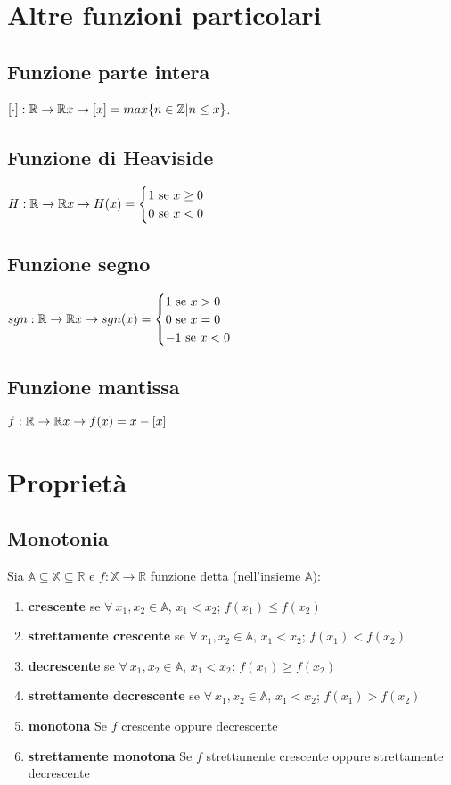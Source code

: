 \section{Altre funzioni particolari}
\subsection{Funzione parte intera}
$[\cdot]: \mathbb{R} \rightarrow \mathbb{R}\\
x \rightarrow [x] = max\{n \in \mathbb{Z} | n\leq x\}$.
\subsection{Funzione di Heaviside}
$H: \mathbb{R} \rightarrow \mathbb{R}\\
x \rightarrow H(x) =
\begin{cases}
1 \text{  se } x \geq 0\\
0 \text{  se } x < 0
\end{cases}$
\subsection{Funzione segno}
$sgn: \mathbb{R} \rightarrow \mathbb{R}\\
x \rightarrow sgn(x) =
\begin{cases}
1 \text{  se } x > 0\\
0 \text{  se } x = 0\\
-1 \text{  se } x < 0
\end{cases}$
\subsection{Funzione mantissa}
$f: \mathbb{R} \rightarrow \mathbb{R}\\
x \rightarrow f(x) = x - [x]$

\section{Proprietà}
\subsection{Monotonia}
Sia $\mathbb{A} \subseteq \mathbb{X} \subseteq \mathbb{R}$ e $f: \mathbb{X} \rightarrow \mathbb{R}$ funzione detta (nell'insieme $\mathbb{A}$):
\begin{enumerate}
\item \textbf{crescente} se $\forall\ x_1,x_2 \in \mathbb{A}$, $x_1<x_2$; $f(x_1) \leq f(x_2)$
\item \textbf{strettamente crescente} se $\forall\ x_1,x_2 \in \mathbb{A}$, $x_1<x_2$; $f(x_1) < f(x_2)$
\item \textbf{decrescente} se $\forall\ x_1,x_2 \in \mathbb{A}$, $x_1<x_2$; $f(x_1) \geq f(x_2)$
\item \textbf{strettamente decrescente} se $\forall\ x_1,x_2 \in \mathbb{A}$, $x_1<x_2$; $f(x_1) > f(x_2)$
\item \textbf{monotona} Se $f$ crescente oppure decrescente
\item \textbf{strettamente monotona} Se $f$ strettamente crescente oppure strettamente decrescente
\end{enumerate}
